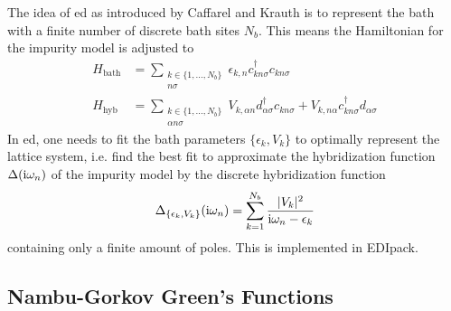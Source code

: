 \documentclass[../main.tex]{subfiles}
\begin{document}
The idea of \gls{ed} as introduced by Caffarel and Krauth \cite{caffarelExactDiagonalizationApproach1994} is to represent the bath with a finite number of discrete bath sites \(N_b\).
This means the Hamiltonian for the impurity model is adjusted to
\begin{align}
	H_{\mathrm{bath}} &= \sum_{\substack{k \in \{1, \ldots, N_b\} \\ n \sigma}} \epsilon_{k, n} c_{k n \sigma}^{\dagger} c_{k n \sigma}  \\
	H_{\mathrm{hyb}} &= \sum_{\substack{k \in \{1, \ldots, N_b\} \\ \alpha n \sigma}} V_{k, \alpha n} d_{\alpha \sigma}^{\dagger} c_{k n \sigma} + V_{k, n \alpha} c_{k n \sigma}^{\dagger} d_{\alpha \sigma}
\end{align}
In \gls{ed}, one needs to fit the bath parameters \(\{\epsilon_k, V_k\}\) to optimally represent the lattice system, i.e. find the best fit to approximate the hybridization function \(\Delta (\mathrm{i} \omega_n)\) of the impurity model by the discrete hybridization function
\begin{equation}
	\Delta_{\{\epsilon_k, V_k\}} (\mathrm{i} \omega_n) = \sum_{k=1}^{N_b} \frac{\vert V_k \vert^2}{\mathrm{i} \omega_n - \epsilon_k}
\end{equation}
containing only a finite amount of poles.
This is implemented in EDIpack.

\subsection*{Nambu-Gorkov Green's Functions}
\end{document}
